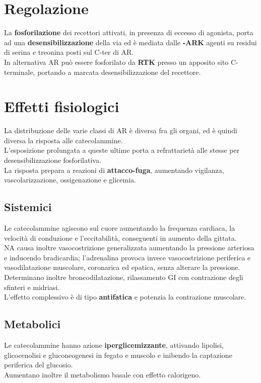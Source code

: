 \documentclass[a4paper, 12pt]{article}
\begin{document}
\section{Regolazione}
La \textbf{fosforilazione} dei recettori attivati, in presenza di eccesso di agonista, porta ad una \textbf{desensibilizzazione} della via ed è mediata dalle \textbf{\textbeta-ARK} agenti su residui di serina e treonina posti sul C-ter di AR.\\
In alternativa AR può essere fosforilato da \textbf{RTK} presso un apposito sito C-terminale, portando a marcata desensibilizzazione del recettore.

\section{Effetti fisiologici}
La distribuzione delle varie classi di AR è diversa fra gli organi, ed è quindi diversa la risposta alle catecolammine.\\
L'esposizione prolungata a queste ultime porta a refrattarietà alle stesse per desensibilizzazione fosforilativa.\\
La risposta prepara a reazioni di \textbf{attacco-fuga}, aumentando vigilanza, vascolarizzazione, ossigenazione e glicemia.

\subsection{Sistemici}
Le catecolammine agiscono sul cuore aumentando la frequenza cardiaca, la velocità di conduzione e l'eccitabilità, conseguenti in aumento della gittata.\\
NA causa inoltre vasocostrizione generalizzata aumentando la pressione arteriosa e inducendo bradicardia; l'adrenalina provoca invece vasocostrizione periferica e vasodilatazione muscolare, coronarica ed epatica, senza alterare la pressione.\\
Determinano inoltre broncodilatazione, rilassamento GI con contrazione degli sfinteri e midriasi.\\
L'effetto complessivo è di tipo \textbf{antifatica} e potenzia la contrazione muscolare.

\subsection{Metabolici}
Le catecolammine hanno azione \textbf{iperglicemizzante}, attivando lipolisi, glicocenolisi e gluconeogenesi in fegato e muscolo e inibendo la captazione periferica del glucosio.\\
Aumentano inoltre il metabolismo basale con effetto calorigeno.
\end{document}
